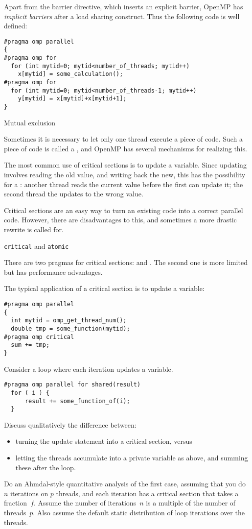 Apart from the barrier directive, which inserts an explicit barrier,
OpenMP has \emph{implicit barriers} after
a load sharing construct. Thus the following code is well defined:
\begin{verbatim}
#pragma omp parallel 
{
#pragma omp for
  for (int mytid=0; mytid<number_of_threads; mytid++)
    x[mytid] = some_calculation();
#pragma omp for
  for (int mytid=0; mytid<number_of_threads-1; mytid++)
    y[mytid] = x[mytid]+x[mytid+1];
}
\end{verbatim}

 {Mutual exclusion}

Sometimes it is necessary to let only one thread execute a piece of code.
Such a piece of code is called a , and
OpenMP has several mechanisms for realizing this.

The most common use of critical sections is to update a variable. Since updating
involves reading the old value, and writing back the new, this has the possibility
for a : another thread reads the current value
before the first can update it; the second thread the updates to the wrong value.

Critical sections are an easy way to turn an existing code into a correct parallel code.
However, there are disadvantages to this, and sometimes a more drastic rewrite
is called for.

 {\texttt{critical} and \texttt{atomic}}

There are two pragmas for critical sections:  and .
The second one is more limited but has performance advantages.

The typical application of a critical section is to update a variable:
\begin{verbatim}
#pragma omp parallel
{
  int mytid = omp_get_thread_num();
  double tmp = some_function(mytid);
#pragma omp critical
  sum += tmp;
}
\end{verbatim}

\begin{exercise}
  Consider  a loop where each iteration updates a variable.
\begin{verbatim}
#pragma omp parallel for shared(result)
  for ( i ) {
      result += some_function_of(i);
  }
\end{verbatim}
  Discuss qualitatively
  the difference between:
  \begin{itemize}
  \item  turning the update statement into a critical section, versus
  \item letting the threads accumulate into a private variable  as above,
    and summing these after the loop.
  \end{itemize}  
  Do an Ahmdal-style quantitative analysis of the first case, assuming
  that you do $n$ iterations on $p$ threads, and each iteration has a
  critical section that takes a fraction~$f$.  Assume the number of
  iterations~$n$ is a multiple of the number of threads~$p$. Also
  assume the default static distribution of loop iterations over the
  threads.
\end{exercise}

